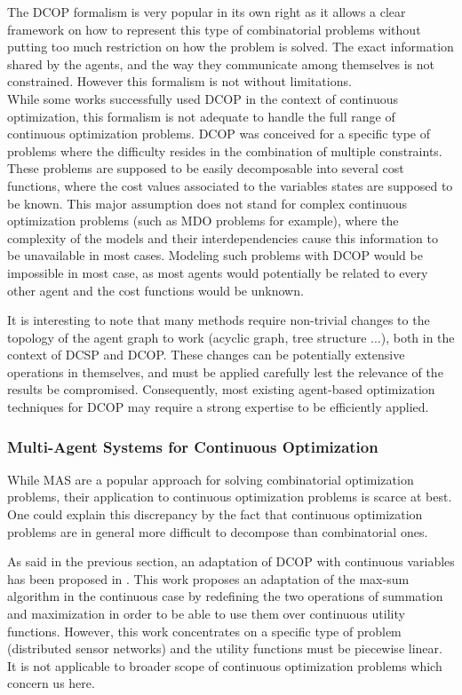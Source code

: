 The DCOP formalism is very popular in its own right as it allows a clear framework on how to represent this type of combinatorial problems without putting too much restriction on how the problem  is solved. The exact information shared by the agents, and the way they communicate among themselves is not constrained. However this formalism is not without limitations.\\
While some works successfully used DCOP in the context of continuous optimization\cite{stranders2009decentralised}, this formalism is not adequate to handle the full range of continuous optimization problems. DCOP was conceived for a specific type of problems where the difficulty resides in the combination of multiple constraints. These problems are supposed to be easily decomposable into several cost functions, where the cost values associated to the variables states are supposed to be known. This major assumption does not stand for complex continuous optimization problems (such as MDO problems for example), where the complexity of the models and their interdependencies cause this information to be unavailable in most cases. Modeling such problems with DCOP would be impossible in most case, as most agents would potentially be related to every other agent and the cost functions would be unknown.

It is interesting to note that many methods require non-trivial changes to the topology of the agent graph to work (acyclic graph, tree structure ...), both in the context of DCSP and DCOP. These changes can  be potentially extensive operations in themselves, and must be applied carefully lest the relevance of the results be compromised. Consequently, most existing agent-based optimization techniques for DCOP may require a strong expertise to be efficiently applied\cite{Ka2011.6}.

\subsubsection{Multi-Agent Systems for Continuous Optimization}

While MAS are a popular approach for solving combinatorial optimization problems, their application to continuous optimization problems is scarce at best. One could explain this discrepancy by the fact that continuous optimization problems are in general more difficult to decompose than combinatorial ones.

As said in the previous section, an adaptation of DCOP with continuous variables has been proposed in \cite{stranders2009decentralised}. This work proposes an adaptation of the max-sum algorithm in the continuous case by redefining the two operations of summation and maximization in order to be able to use them over continuous utility functions. However, this work concentrates on a specific type of problem (distributed sensor networks) and the utility functions must be piecewise linear. It is not applicable to broader scope of continuous optimization problems which concern us here.

